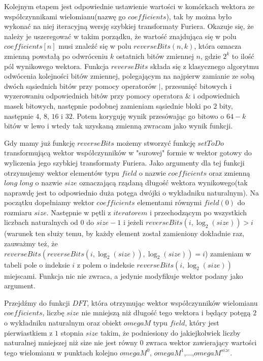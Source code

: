 \documentclass{article}
\begin{document}
Kolejnym etapem jest odpowiednie ustawienie wartości w komórkach wektora ze współczynnikami wielomianu(nazwę go $coefficients$), tak by można było wykonać na niej iteracyjną wersję szybkiej transformaty
Furiera. Okazuje się, że należy je uszeregować w takim porządku, że wartość znajdująca się w polu $coefficients[n]$ musi znaleźć
się w polu $reverseBits(n,k)$, która oznacza zmienną powstałą po odwróceniu $k$ ostatnich bitów zmiennej $n$, gdzie 
$2^k$ to ilość pól wynikowego wektora. Funkcja $reverseBits$ składa się z klasycznego algorytmu odwócenia kolejności bitów 
zmiennej, polegającym na najpierw zamianie ze sobą dwóch sąsiednich bitów przy pomocy operatorów $|$, przesunięć bitowych
i wyzerowaniu odpowiednich bitów przy pomocy operatora $\&$ i odpowiednich masek bitowych, następnie podobnej zamieniam sąsiednie bloki
po $2$ bity, następnie $4$, $8$, $16$ i $32$. Potem koryguję wynik przesówając go bitowo o $64-k$ bitów w lewo i wtedy tak uzyskaną zmienną zwracam jako wynik funkcji.

Gdy mamy już funkcję $reverseBits$ możemy stworzyć funkcję $setToDo$ transformującą wektor współczynników w "surowej" formie w wektor gotowy
do wyliczenia jego szybkiej transformaty Furiera. Jako argumenty dla tej funkcji otrzymujemy wektor elementów typu $field$ o nazwie $coefficients$ oraz
zmienną $long$ $long$ o nazwie $size$ oznaczającą rządaną długość wektora wynikowego(tak naprawdę jest to odpowiednio duża potęga dwójki o wykładniku naturalnym). Na początku dopełniamy wektor $coefficients$ elementami równymi $field(0)$ do rozmiaru $size$. Następnie w pętli z $iteratorem$ i przechodzącym po wszystkich liczbach naturalnych od $0$ do $size-1$ i jeżeli $reverseBits(i,\log_2(size)) > i$(warunek ten służy temu, by każdy element został zamieniony dokładnie raz, zauważmy też, że $reverseBits( reverseBits (i ,\log_2(size)),\log_2(size))=i$) zamieniam w tabeli pole o indeksie $i$ z polem o indeksie 
$reverseBits (i ,\log_2(size))$ miejscami. Funkcja nic nie zwraca, a jedynie modyfikuje wektor podany jako argument.

Przejdźmy do funkcji $DFT$, która otrzymując wektor współczynników wielomianu $coefficients$, 
liczbę $size$ nie mniejszą niż długość tego wektora i będący potęgą $2$ o wykładniku naturalnym oraz obiekt $omegaM$ typu $field$,
który jest pierwiastkiem z $1$ stopnia $size$ takim, że podniesiony do jakiejkolwiek liczby naturalnej mniejszej niż size nie jest 
równy $0$ zwraca wektor zawierający wartości tego wielomianu w punktach kolejno $omegaM^0$, $omegaM^1$,...,$omegaM^{size}$. 
\end{document}
